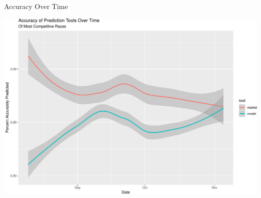 \documentclass[ignorenonframetext,]{beamer}
\begin{document}
\begin{frame}{Accuracy Over Time}

\includegraphics{markets_models_files/figure-beamer/accuracy-1.pdf}

\end{frame}
\end{document}
